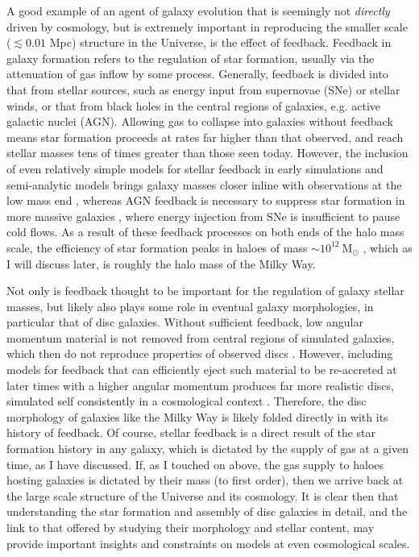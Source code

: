 A good example of an agent of galaxy evolution that is seemingly not \emph{directly} driven by cosmology, but is extremely important in reproducing the smaller scale ($\lesssim 0.01$ Mpc) structure in the Universe, is the effect of feedback. Feedback in galaxy formation refers to the regulation of star formation, usually via the attenuation of gas inflow by some process. Generally, feedback is divided into that from stellar sources, such as energy input from supernovae (SNe) or stellar winds, or that from black holes in the central regions of galaxies, e.g. active galactic nuclei (AGN). Allowing gas to collapse into galaxies without feedback means star formation proceeds at rates far higher than that observed, and reach stellar masses tens of times greater than those seen today. However, the inclusion of even relatively simple models for stellar feedback in early simulations and semi-analytic models brings galaxy masses closer inline with observations at the low mass end  \citep[$M\lesssim 10^{12}\ \mathrm{M_\odot}$ e.g.][]{1996ApJS..105...19K,1999MNRAS.310.1087S,2003MNRAS.339..312S}, whereas AGN feedback is necessary to suppress star formation in more massive galaxies \citep[$M\gtrsim 10^{12}\ \mathrm{M_\odot}$][]{2006MNRAS.370..645B,2008MNRAS.391..481S}, where energy injection from SNe is insufficient to pause cold flows. As a result of these feedback processes on both ends of the halo mass scale, the efficiency of star formation peaks in haloes of mass $\sim 10^{12}\ \mathrm{M_\odot}$ \citep[e.g.][]{2013ApJ...770...57B}, which as I will discuss later, is roughly the halo mass of the Milky Way. 

Not only is feedback thought to be important for the regulation of galaxy stellar masses, but likely also plays some role in eventual galaxy morphologies, in particular that of disc galaxies. Without sufficient feedback, low angular momentum material is not removed from central regions of simulated galaxies, which then do not reproduce properties of observed discs \citep[e.g.][and references therein]{2010MNRAS.408..812S}. However, including models for feedback that can efficiently eject such material to be re-accreted at later times with a higher angular momentum produces far more realistic discs, simulated self consistently in a cosmological context \citep[e.g.][]{2011MNRAS.415.1051B,2012MNRAS.427..379M,2013MNRAS.428..129S}. Therefore, the disc morphology of galaxies like the Milky Way is likely folded directly in with its history of feedback. Of course, stellar feedback is a direct result of the star formation history in any galaxy, which is dictated by the supply of gas at a given time, as I have discussed. If, as I touched on above, the gas supply to haloes hosting galaxies is dictated by their mass (to first order), then we arrive back at the large scale structure of the Universe and its cosmology. It is clear then that understanding the star formation and assembly of disc galaxies in detail, and the link to that offered by studying their morphology and stellar content, may provide important insights and constraints on models at even cosmological scales.


